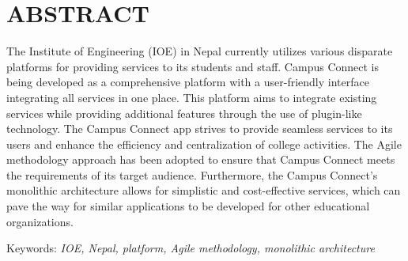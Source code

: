 \chapter*{ABSTRACT} 

The Institute of Engineering (IOE) in Nepal currently utilizes various disparate platforms for providing services to its students and staff. Campus Connect is being developed as a comprehensive platform with a user-friendly interface integrating all services in one place. This platform aims to integrate existing services while providing additional features through the use of plugin-like technology. The Campus Connect app strives to provide seamless services to its users and enhance the efficiency and centralization of college activities. The Agile methodology approach has been adopted to ensure that Campus Connect meets the requirements of its target audience. Furthermore, the Campus Connect's monolithic architecture allows for simplistic and cost-effective services, which can pave the way for similar applications to be developed for other educational organizations.

\vspace{1cm} Keywords: \textit{IOE, Nepal, platform, Agile methodology, monolithic architecture}